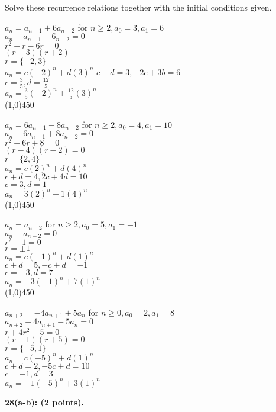 \documentclass[12pt]{article}  %
\begin{document}
\noindent
Solve these recurrence relations together with the initial conditions given.

\noindent
$a_n=a_{n-1}+6a_{n-2}$ for $n\geq2,a_0=3,a_1=6$\\
$a_n-a_{n-1}-6_{n-2}=0$\\
$r^2-r-6r=0$\\
$(r-3)(r+2)$\\
$r=\{-2,3\}$\\
$a_n=c(-2)^n+d(3)^n$
$c+d=3,-2c+3b=6$\\
$\displaystyle c=\frac{3}{5},d=\frac{12}{5}$\\
$\displaystyle a_n=\frac{3}{5}(-2)^n+\frac{12}{5}(3)^n$\\
\line(1,0){450}

\noindent
$a_n=6a_{n-1}-8a_{n-2}$ for $n\geq2,a_0=4,a_1=10$\\
$a_n-6a_{n-1}+8a_{n-2}=0$\\
$r^2-6r+8=0$\\
$(r-4)(r-2)=0$\\
$r=\{2,4\}$\\
$a_n=c(2)^n+d(4)^n$\\
$c+d=4,2c+4d=10$\\
$c=3,d=1$\\
$a_n=3(2)^n+1(4)^n$\\
\line(1,0){450}

\noindent
$a_n=a_{n-2}$ for $n\geq2,a_0=5,a_1=-1$\\
$a_n-a_{n-2}=0$\\
$r^2-1=0$\\
$r=\pm1$\\
$a_n=c(-1)^n+d(1)^n$\\
$c+d=5,-c+d=-1$\\
$c=-3,d=7$\\
$a_n=-3(-1)^n+7(1)^n$\\
\line(1,0){450}

\clearpage
\noindent
$a_{n+2}=-4a_{n+1}+5a_n$ for $n\geq0,a_0=2,a_1=8$\\
$a_{n+2}+4a_{n+1}-5a_n=0$\\
$r+4r^2-5=0$\\
$(r-1)(r+5)=0$\\
$r=\{-5,1\}$\\
$a_n=c(-5)^n+d(1)^n$\\
$c+d=2,-5c+d=10$\\
$c=-1,d=3$\\
$a_n=-1(-5)^n+3(1)^n$

\noindent
{\bf 28(a-b): (2 points).}
\end{document}
